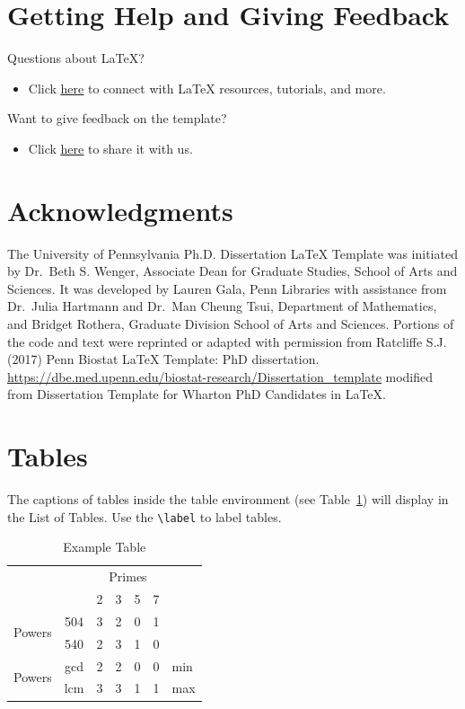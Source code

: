 \section{Getting Help and Giving Feedback} \label{sec:helpfeedback}
Questions about LaTeX?
\begin{itemize}
    \item Click \underline{\href{https://guides.library.upenn.edu/LaTeX}{here}} to connect with LaTeX resources, tutorials, and more.
\end{itemize}
Want to give feedback on the template?
\begin{itemize}
    \item Click \underline{\href{https://upenn.libwizard.com/f/latexbetadissertationfeedback}{here}} to share it with us.
\end{itemize}

\section{Acknowledgments}
The University of Pennsylvania Ph.D. Dissertation LaTeX Template was initiated by Dr.~Beth S. Wenger, Associate Dean for Graduate Studies, School of Arts and Sciences. It was developed by Lauren Gala, Penn Libraries with assistance from Dr.~Julia Hartmann and Dr.~Man Cheung Tsui, Department of Mathematics, and Bridget Rothera, Graduate Division School of Arts and Sciences. Portions of the code and text were reprinted or adapted with permission from Ratcliffe S.J. (2017) Penn Biostat LaTeX Template: PhD dissertation. \underline{\url{https://dbe.med.upenn.edu/biostat-research/Dissertation\_template}} modified from Dissertation Template for Wharton PhD Candidates in LaTeX.

\section{Tables}
The captions of tables inside the table environment (see Table~\ref{extab}) will display in the List of Tables. Use the \verb|\label| to label tables. 
\begin{table}[h]
\begin{center}
\begin{tabular}{cc|c|c|c|c|l}
\cline{3-6}
& & \multicolumn{4}{|c|}{Primes} \\ \cline{3-6}
& & 2 & 3 & 5 & 7 \\ \cline{1-6}
\multicolumn{1}{|c|}{\multirow{2}{*}{Powers}} &
\multicolumn{1}{|c|}{504} & 3 & 2 & 0 & 1 &     \\ \cline{2-6}
\multicolumn{1}{|c|}{}                        &
\multicolumn{1}{|c|}{540} & 2 & 3 & 1 & 0 &     \\ \cline{1-6}
\multicolumn{1}{|c|}{\multirow{2}{*}{Powers}} &
\multicolumn{1}{|c|}{gcd} & 2 & 2 & 0 & 0 & min \\ \cline{2-6}
\multicolumn{1}{|c|}{}                        &
\multicolumn{1}{|c|}{lcm} & 3 & 3 & 1 & 1 & max \\ \cline{1-6}
\end{tabular}
\caption{Example Table}\label{extab}
\end{center}
\end{table}

